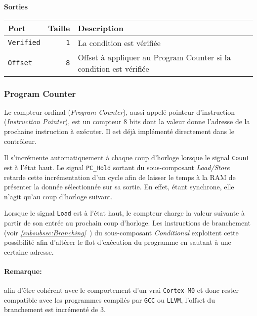 \vspace{1em}
\textbf{Sorties}\\

\begin{tabular}{|l|r|l|}
\hline 
\textbf{Port} & \textbf{Taille} & \textbf{Description}\\
\hline

\hline
\texttt{Verified}	&  \texttt{1} & La condition est vérifiée\\
\hline
\texttt{Offset}		&  \texttt{8} & Offset à appliquer au Program Counter si la condition est vérifiée\\

\hline
\end{tabular}



\subsubsection{Program Counter}


Le compteur ordinal (\textit{Program Counter}), aussi appelé pointeur d'instruction (\textit{Instruction Pointer}),
est un compteur 8 bits dont la valeur donne l'adresse de la prochaine instruction à exécuter.
Il est déjà implémenté directement dans le contrôleur.

Il s'incrémente automatiquement à chaque coup d'horloge lorsque le signal \texttt{Count} est à l'état haut.
Le signal \texttt{PC\_Hold} sortant du sous-composant \textit{Load/Store} retarde cette incrémentation d'un cycle afin de laisser le temps à la RAM de présenter la donnée sélectionnée sur sa sortie.
En effet, étant synchrone, elle n'agit qu'au coup d'horloge suivant.

Lorsque le signal \texttt{Load} est à l'état haut, le compteur charge la valeur suivante à partir de son entrée au prochain coup d'horloge.
Les instructions de branchement (voir \textit{\ref{subsubsec:Branching}~}) du sous-composant \textit{Conditional} exploitent cette possibilité
afin d'altérer le flot d'exécution du programme en sautant à une certaine adresse.

\paragraph{Remarque:} afin d'être cohérent avec le comportement d'un vrai \texttt{Cortex-M0} et donc rester compatible avec les programmes compilés par \texttt{GCC} ou \texttt{LLVM},
l'offset du branchement est incrémenté de 3.


